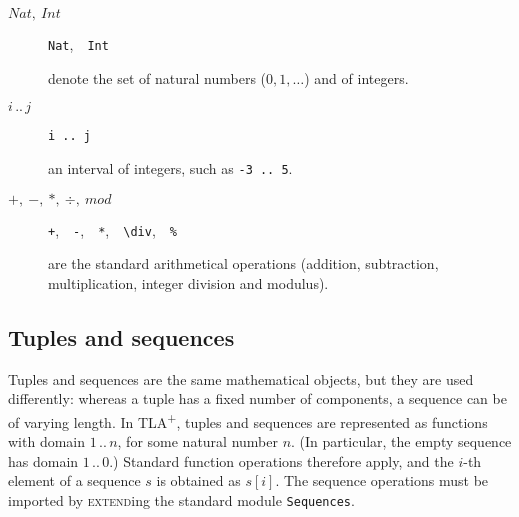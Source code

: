 \documentclass[11pt,fleqn]{article}
\newcommand{\tlaplus}{TLA\textsuperscript{+}\xspace}
\newcommand{\kw}[1]{\textnormal{\textsc{#1}}}
\newcommand{\EXTEND}{\kw{extend}}
\begin{document}
\begin{description}
\item[$\mathit{Nat},\ \mathit{Int}$]\qquad \verb|Nat|,\ \ \verb|Int|

  denote the set of natural numbers ($0, 1, \dots$) and of integers.
  
\item[$i\,..\,j$]\qquad \verb|i .. j|

  an interval of integers, such as \verb|-3 .. 5|.
\item[$+,\ -,\ *,\ \div,\ \mathit{mod}$]\qquad
  \verb|+|,\ \ \verb|-|,\ \ \verb|*|,\ \ \verb|\div|,\ \ \verb|%|

  are the standard arithmetical operations (addition, subtraction,
  multiplication, integer division and modulus).
\end{description}


\subsection{Tuples and sequences}

Tuples and sequences are the same mathematical objects, but they are used
differently: whereas a tuple has a fixed number of components, a sequence can be
of varying length. In \tlaplus, tuples and sequences are represented as
functions with domain $1\,..\,n$, for some natural number $n$. (In particular,
the empty sequence has domain $1\,..\,0$.) Standard function operations
therefore apply, and the $i$-th element of a sequence $s$ is obtained as $s[i]$.
The sequence operations must be imported by \EXTEND{}ing the standard module
\verb|Sequences|.
\end{document}
